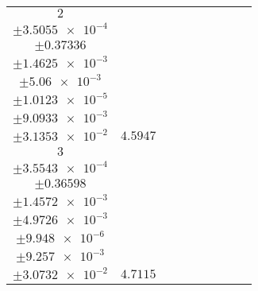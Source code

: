 \documentclass[8pt]{article}
\begin{document}
\begin{longtable}[l]{c c c c c c c c c}
$\num{2}$ & \begin{tabular}[c]{@{}c@{}}$\num{5.4325e-2}$ \\ $\pm\num{3.5055e-4}$\end{tabular} & \begin{tabular}[c]{@{}c@{}}$\num{8.1876e-3}$ \\ $\pm\num{0.37336}$\end{tabular} & \begin{tabular}[c]{@{}c@{}}$\num{-3.8348}$ \\ $\pm\num{1.4625e-3}$\end{tabular} & \begin{tabular}[c]{@{}c@{}}$\num{2.0277e+3}$ \\ $\pm\num{5.06e-3}$\end{tabular} & \begin{tabular}[c]{@{}c@{}}$\num{4.0565}$ \\ $\pm\num{1.0123e-5}$\end{tabular} & \begin{tabular}[c]{@{}c@{}}$\num{1.1607}$ \\ $\pm\num{9.0933e-3}$\end{tabular} & \begin{tabular}[c]{@{}c@{}}$\num{4.2076}$ \\ $\pm\num{3.1353e-2}$\end{tabular} & $\num{4.5947}$\\
$\num{3}$ & \begin{tabular}[c]{@{}c@{}}$\num{5.6011e-2}$ \\ $\pm\num{3.5543e-4}$\end{tabular} & \begin{tabular}[c]{@{}c@{}}$\num{0.33542}$ \\ $\pm\num{0.36598}$\end{tabular} & \begin{tabular}[c]{@{}c@{}}$\num{3.8345}$ \\ $\pm\num{1.4572e-3}$\end{tabular} & \begin{tabular}[c]{@{}c@{}}$\num{2.0353e+3}$ \\ $\pm\num{4.9726e-3}$\end{tabular} & \begin{tabular}[c]{@{}c@{}}$\num{4.0718}$ \\ $\pm\num{9.948e-6}$\end{tabular} & \begin{tabular}[c]{@{}c@{}}$\num{1.196}$ \\ $\pm\num{9.257e-3}$\end{tabular} & \begin{tabular}[c]{@{}c@{}}$\num{4.2002}$ \\ $\pm\num{3.0732e-2}$\end{tabular} & $\num{4.7115}$\\

\end{longtable}
\end{document}
